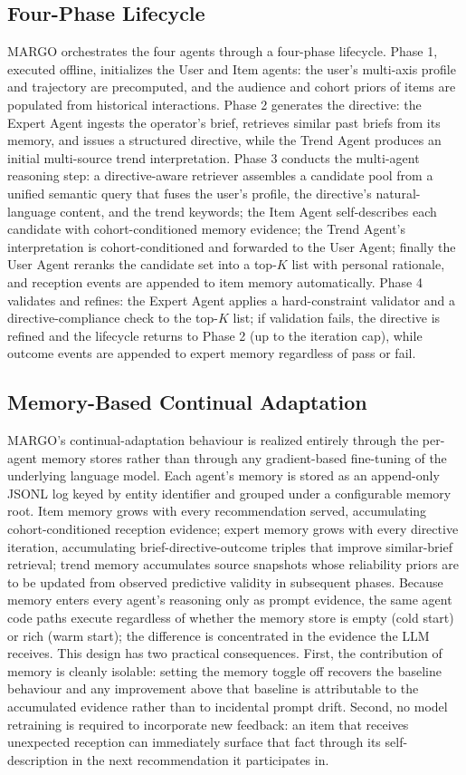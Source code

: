 \documentclass[master,english,final]{postech-ucs}
\begin{document}
\subsection{Four-Phase Lifecycle}
MARGO orchestrates the four agents through a four-phase lifecycle.
Phase 1, executed offline, initializes the User and Item agents: the user's multi-axis profile and trajectory are precomputed, and the audience and cohort priors of items are populated from historical interactions.
Phase 2 generates the directive: the Expert Agent ingests the operator's brief, retrieves similar past briefs from its memory, and issues a structured directive, while the Trend Agent produces an initial multi-source trend interpretation.
Phase 3 conducts the multi-agent reasoning step: a directive-aware retriever assembles a candidate pool from a unified semantic query that fuses the user's profile, the directive's natural-language content, and the trend keywords; the Item Agent self-describes each candidate with cohort-conditioned memory evidence; the Trend Agent's interpretation is cohort-conditioned and forwarded to the User Agent; finally the User Agent reranks the candidate set into a top-$K$ list with personal rationale, and reception events are appended to item memory automatically.
Phase 4 validates and refines: the Expert Agent applies a hard-constraint validator and a directive-compliance check to the top-$K$ list; if validation fails, the directive is refined and the lifecycle returns to Phase 2 (up to the iteration cap), while outcome events are appended to expert memory regardless of pass or fail.

\subsection{Memory-Based Continual Adaptation}
MARGO's continual-adaptation behaviour is realized entirely through the per-agent memory stores rather than through any gradient-based fine-tuning of the underlying language model.
Each agent's memory is stored as an append-only JSONL log keyed by entity identifier and grouped under a configurable memory root.
Item memory grows with every recommendation served, accumulating cohort-conditioned reception evidence; expert memory grows with every directive iteration, accumulating brief-directive-outcome triples that improve similar-brief retrieval; trend memory accumulates source snapshots whose reliability priors are to be updated from observed predictive validity in subsequent phases.
Because memory enters every agent's reasoning only as prompt evidence, the same agent code paths execute regardless of whether the memory store is empty (cold start) or rich (warm start); the difference is concentrated in the evidence the LLM receives.
This design has two practical consequences.
First, the contribution of memory is cleanly isolable: setting the memory toggle off recovers the baseline behaviour and any improvement above that baseline is attributable to the accumulated evidence rather than to incidental prompt drift.
Second, no model retraining is required to incorporate new feedback: an item that receives unexpected reception can immediately surface that fact through its self-description in the next recommendation it participates in.
\end{document}
